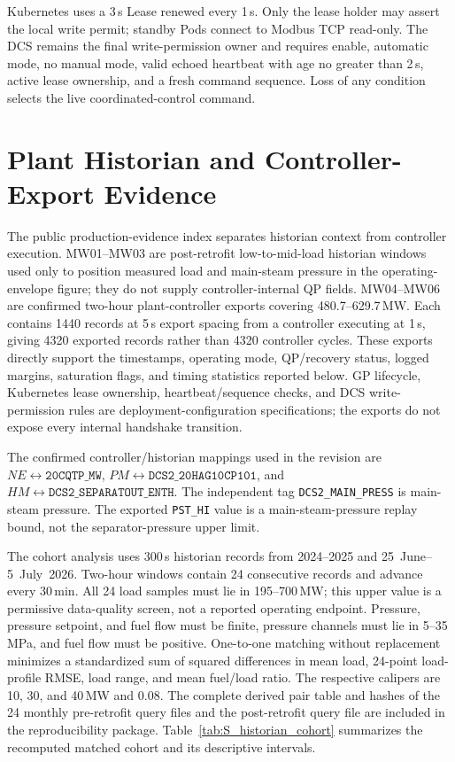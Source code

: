 Kubernetes uses a 3\,s Lease renewed every 1\,s. Only the lease holder may assert the local write permit; standby Pods connect to Modbus TCP read-only. The DCS remains the final write-permission owner and requires enable, automatic mode, no manual mode, valid echoed heartbeat with age no greater than 2\,s, active lease ownership, and a fresh command sequence. Loss of any condition selects the live coordinated-control command.

\section{Plant Historian and Controller-Export Evidence}
\label{sec:supp_plant}

The public production-evidence index separates historian context from controller execution. MW01--MW03 are post-retrofit low-to-mid-load historian windows used only to position measured load and main-steam pressure in the operating-envelope figure; they do not supply controller-internal QP fields. MW04--MW06 are confirmed two-hour plant-controller exports covering 480.7--629.7\,MW. Each contains 1440 records at 5\,s export spacing from a controller executing at 1\,s, giving 4320 exported records rather than 4320 controller cycles. These exports directly support the timestamps, operating mode, QP/recovery status, logged margins, saturation flags, and timing statistics reported below. GP lifecycle, Kubernetes lease ownership, heartbeat/sequence checks, and DCS write-permission rules are deployment-configuration specifications; the exports do not expose every internal handshake transition.

The confirmed controller/historian mappings used in the revision are $NE\leftrightarrow\texttt{20CQTP\_MW}$, $PM\leftrightarrow\texttt{DCS2\_20HAG10CP101}$, and $HM\leftrightarrow\texttt{DCS2\_SEPARATOUT\_ENTH}$. The independent tag \texttt{DCS2\_MAIN\_PRESS} is main-steam pressure. The exported \texttt{PST\_HI} value is a main-steam-pressure replay bound, not the separator-pressure upper limit.

The cohort analysis uses 300\,s historian records from 2024--2025 and 25~June--5~July~2026. Two-hour windows contain 24 consecutive records and advance every 30\,min. All 24 load samples must lie in 195--700\,MW; this upper value is a permissive data-quality screen, not a reported operating endpoint. Pressure, pressure setpoint, and fuel flow must be finite, pressure channels must lie in 5--35\,MPa, and fuel flow must be positive. One-to-one matching without replacement minimizes a standardized sum of squared differences in mean load, 24-point load-profile RMSE, load range, and mean fuel/load ratio. The respective calipers are 10, 30, and 40\,MW and 0.08. The complete derived pair table and hashes of the 24 monthly pre-retrofit query files and the post-retrofit query file are included in the reproducibility package. Table~\ref{tab:S_historian_cohort} summarizes the recomputed matched cohort and its descriptive intervals.

